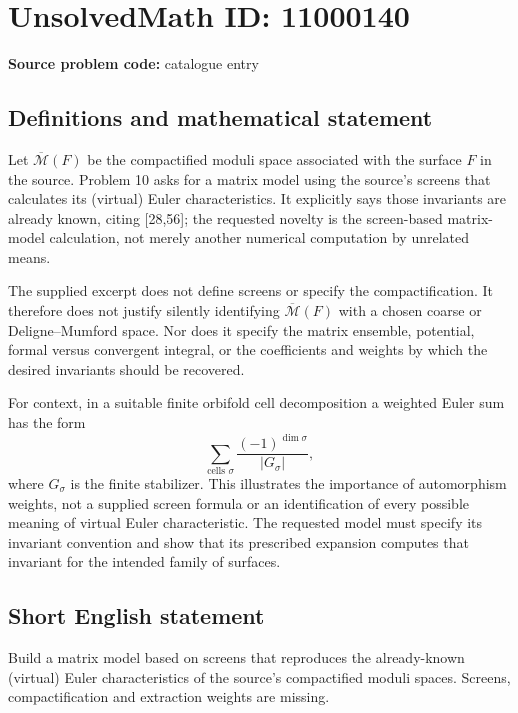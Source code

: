 \documentclass[11pt]{article}
\begin{document}
\section*{UnsolvedMath ID: 11000140}
\textbf{Source problem code:} catalogue entry
\subsection{Definitions and mathematical statement}
Let $\overline{\mathcal M}(F)$ be the compactified moduli space associated with the surface $F$ in the source. Problem 10 asks for a matrix model using the source's screens that calculates its (virtual) Euler characteristics. It explicitly says those invariants are already known, citing [28,56]; the requested novelty is the screen-based matrix-model calculation, not merely another numerical computation by unrelated means.

The supplied excerpt does not define screens or specify the compactification. It therefore does not justify silently identifying $\overline{\mathcal M}(F)$ with a chosen coarse or Deligne--Mumford space. Nor does it specify the matrix ensemble, potential, formal versus convergent integral, or the coefficients and weights by which the desired invariants should be recovered.

For context, in a suitable finite orbifold cell decomposition a weighted Euler sum has the form
\[
 \sum_{\text{cells }\sigma}\frac{(-1)^{\dim\sigma}}{|G_\sigma|},
\]
where $G_\sigma$ is the finite stabilizer. This illustrates the importance of automorphism weights, not a supplied screen formula or an identification of every possible meaning of virtual Euler characteristic. The requested model must specify its invariant convention and show that its prescribed expansion computes that invariant for the intended family of surfaces.
\subsection{Short English statement}
Build a matrix model based on screens that reproduces the already-known (virtual) Euler characteristics of the source's compactified moduli spaces. Screens, compactification and extraction weights are missing.
\end{document}
